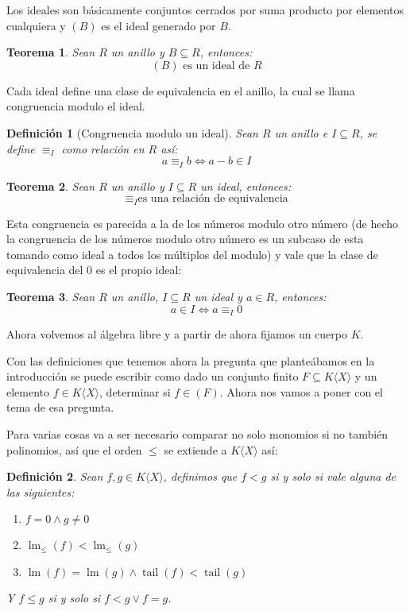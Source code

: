 \documentclass{report}
\theoremstyle{customstyle}
\newtheorem{definition}{Definición}[chapter]
\newtheorem{theorem}{Teorema}[chapter]
\theoremstyle{factstyle}
\DeclareMathOperator{\lm}{lm}
\DeclareMathOperator{\tail}{tail}
\begin{document}
Los ideales son básicamente conjuntos cerrados por suma producto por elementos cualquiera y $(B)$ es el ideal generado por $B$.

\begin{theorem}
  Sean $R$ un anillo y $B ⊆ R$, entonces:
  \[ (B)\text{ es un ideal de }R \]
\end{theorem}

Cada ideal define una clase de equivalencia en el anillo, la cual se llama congruencia modulo el ideal.

\begin{definition}[Congruencia modulo un ideal]\label{def:congruencia mod ideal}
  Sean $R$ un anillo e $I ⊆ R$, se define $≡_I$ como relación en $R$ así:
  \[ a ≡_I b ⇔ a - b ∈ I \]
\end{definition}

\begin{theorem}\label{thm:congruencia mod ideal es equivalencia}
  Sean $R$ un anillo y $I ⊆ R$ un ideal, entonces:
  \[ ≡_I \text{es una relación de equivalencia} \]
\end{theorem}

Esta congruencia es parecida a la de los números modulo otro número (de hecho la congruencia de los números modulo otro número es un subcaso de esta tomando como ideal a todos los múltiplos del modulo) y vale que la clase de equivalencia del $0$ es el propio ideal:

\begin{theorem}\label{thm:en ideal ⇔ congruente 0}
Sean $R$ un anillo, $I ⊆ R$ un ideal y $a ∈ R$, entonces:
\[ a ∈ I ⇔ a ≡_I 0 \]
\end{theorem}

Ahora volvemos al álgebra libre y a partir de ahora fijamos un cuerpo $K$.

Con las definiciones que tenemos ahora la pregunta que planteábamos en la introducción se puede escribir como dado un conjunto finito $F ⊆ K⟨X⟩$ y un elemento $f ∈ K⟨X⟩$, determinar si $f ∈ (F)$. Ahora nos vamos a poner con el tema de esa pregunta.

Para varias cosas va a ser necesario comparar no solo monomios si no también polinomios, así que el orden $≤$ se extiende a $K⟨X⟩$ así:

\begin{definition}
  Sean $f, g ∈  K⟨X⟩$, definimos que $f < g$ si y solo si vale alguna de las siguientes:
  \begin{enumerate}
    \item $f = 0 ∧ g ≠ 0$
    \item $\lm_≤(f) < \lm_≤(g)$
    \item $\lm(f) = \lm(g) ∧ \tail(f) < \tail(g)$
  \end{enumerate}
  Y $f ≤ g$ si y solo si $f < g ∨ f = g$.
\end{definition}
\end{document}
